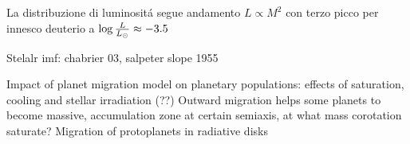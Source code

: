 \begin{workout}
	La distribuzione di luminosit\'a segue andamento $L\propto M^2$ con terzo picco per innesco deuterio a $\log{\frac{L}{L_{\odot}}}\approx-3.5$
\end{workout}

\begin{workout}[Relazione $M_p$ vs $Z_p$]
	
\end{workout}

\begin{workout}
	
\end{workout}

\begin{workout}

\end{workout}

\begin{workout}
Stelalr imf: chabrier 03, salpeter slope 1955
\end{workout}




\begin{workout}
Impact of planet migration model on planetary populations: effects of saturation, cooling and stellar irradiation (??)
Outward migration helps some planets to become massive, accumulation zone at certain semiaxis, at what mass corotation saturate?
Migration of protoplanets in radiative disks
\end{workout}
